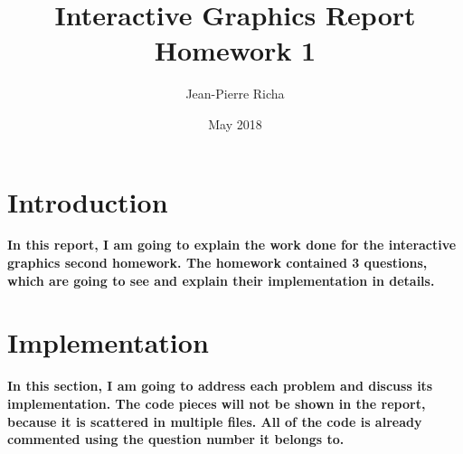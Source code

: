 \documentclass{article}
\begin{document}
\title{Interactive Graphics Report\\
		Homework 1}
\author{Jean-Pierre Richa}
\date{May 2018}
\maketitle
\section {Introduction}
\textbf {In this report, I am going to explain the work done for the interactive graphics second homework.
The homework contained 3 questions, which  are going to see and explain their implementation in details.}

\section {Implementation}
\textbf{In this section, I am going to address each problem and discuss its implementation. The code pieces will not be shown in the report, because it is scattered in multiple files. All of the code is already commented using the question number it belongs to.}
\end{document}
